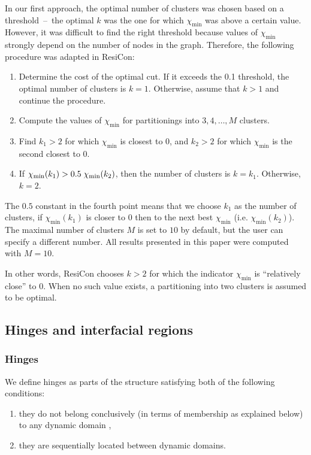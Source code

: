 \documentclass[a4paper,11pt,twoside]{book}%
\begin{document}
In our first approach, the optimal number of clusters was chosen based on a threshold~--~the optimal $k$ was the one for which $\chi_{\text{min}}$ was above a certain value.
However, it was difficult to find the right threshold because values of $\chi_{\text{min}}$ strongly depend on the number of nodes in the graph.
Therefore, the following procedure was adapted in ResiCon:
\begin{enumerate}
\item Determine the cost of the optimal cut.
If it exceeds the 0.1 threshold, the optimal number of clusters is $k=1$.
Otherwise, assume that $k>1$ and continue the procedure.
\item Compute the values of $\chi_{\text{min}}$ for partitionings into $ 3,4,\ldots,M$ clusters.
\item Find $k_1>2$ for which $\chi_{\text{min}}$ is closest to 0, and $k_2>2$ for which $\chi_{\text{min}}$ is the second closest to 0.
\item If $\chi_{\text{min}}(k_1)>0.5\hspace{1mm}\chi_\text{min}(k_2)$, then the number of clusters is $k=k_1$.
Otherwise, $k=2$.
\end{enumerate}
The $0.5$ constant in the fourth point means that we choose $k_1$ as the number of clusters, if $\chi_\text{min}(k_1)$ is closer to $0$ then to the next best $\chi_\text{min}$ (i.e. $\chi_\text{min}(k_2)$).
The maximal number of clusters $M$ is set to $10$ by default, but the user can specify a different number.
All results presented in this paper were computed with $M=10$.

In other words, ResiCon chooses $k>2$ for which the indicator $\chi_\text{min}$ is ``relatively close'' to 0.
When no such value exists, a partitioning into two clusters is assumed to be optimal.
\subsection*{Hinges and interfacial regions}
\subsubsection*{Hinges}
We define hinges as parts of the structure satisfying both of the following conditions:
\begin{enumerate}
\item they do not belong conclusively (in terms of membership as explained below) to any dynamic domain ,
\item they are sequentially located between dynamic domains.
\end{enumerate}
\end{document}
